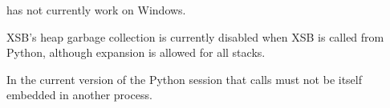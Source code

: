
\bi
\item \januspy{} has not currently work on Windows.
\item XSB's heap garbage collection is currently disabled when XSB is
  called from Python, although expansion is allowed for all stacks.
\item In the current version of \januspy{} the Python session that
  calls \januspy{} must not be itself embedded in another process.
  \ei
  
 


